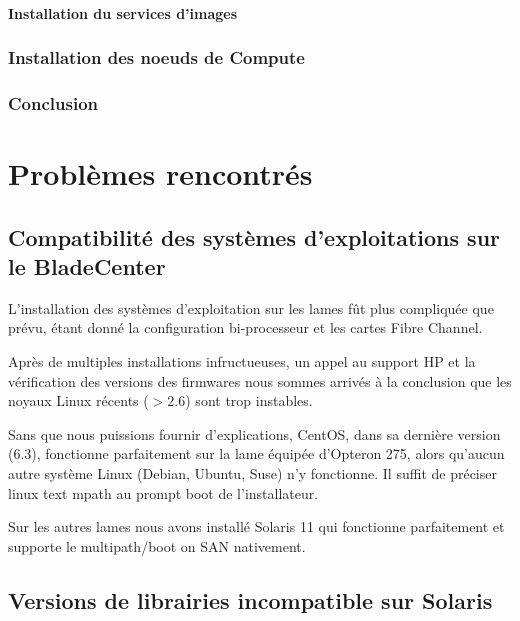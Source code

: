 \documentclass[a4paper,oneside]{report}
\begin{document}
\subsubsection{Installation du services d'images}

\subsection{Installation des noeuds de Compute}



\subsection{Conclusion}


\chapter{Problèmes rencontrés}
\section{Compatibilité des systèmes d'exploitations sur le BladeCenter}
\label{sec:compatblade}
L'installation des systèmes d'exploitation sur les lames fût plus compliquée que prévu, étant donné la configuration bi-processeur et les cartes Fibre Channel.

Après de multiples installations infructueuses, un appel au support HP et la vérification des versions des firmwares nous sommes arrivés à la conclusion que les noyaux Linux récents ($ > 2.6 $) sont trop instables.

Sans que nous puissions fournir d'explications, CentOS, dans sa dernière version (6.3), fonctionne parfaitement sur la lame équipée d'Opteron 275, alors qu'aucun autre système Linux (Debian, Ubuntu, Suse) n'y fonctionne.
Il suffit de préciser linux text mpath au prompt boot de l'installateur.

Sur les autres lames nous avons installé Solaris 11 qui fonctionne parfaitement et supporte le multipath/boot on SAN nativement.

\section{Versions de librairies incompatible sur Solaris}
\label{sec:libsolaris}
\end{document}

